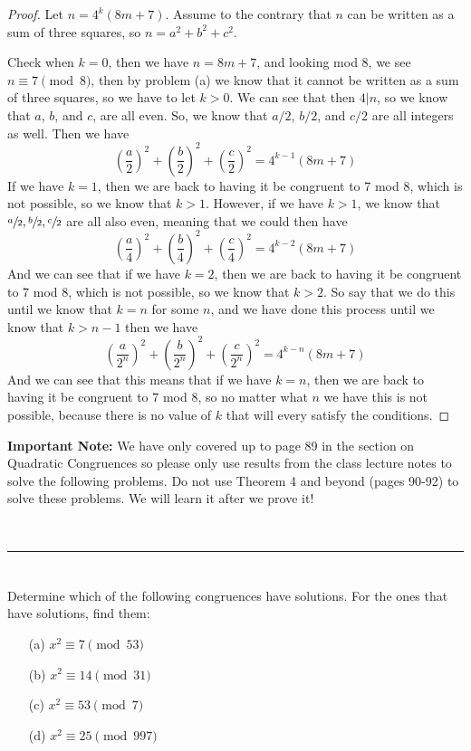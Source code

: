 \documentclass[11pt]{article}
\begin{document}
\begin{proof}
  Let $n=4^k(8m+7)$. Assume to the contrary that $n$ can be written as a sum of three squares, so $n=a^2+b^2+c^2$.

  Check when $k=0$, then we have $n=8m+7$, and looking mod 8, we see $n\equiv 7\pmod{8}$, then by problem (a) we know that it cannot be written as a sum of three squares, so we have to let $k>0$.
  We can see that then $4|n$, so we know that $a$, $b$, and $c$, are all even. So, we know that $a/2$, $b/2$, and $c/2$ are all integers as well. Then we have
  \[
    \left(\frac{a}{2}\right)^2 + \left(\frac{b}{2}\right)^2 + \left(\frac{c}{2}\right)^2 = 4^{k-1} (8m+7)
  \]
  If we have $k=1$, then we are back to having it be congruent to 7 mod 8, which is not possible, so we know that $k>1$. However, if we have $k>1$, we know that $\sfrac{a}{2},\sfrac{b}{2}, \sfrac{c}{2}$ are all also even, meaning that we could then have
  \[
    \left(\frac{a}{4}\right)^2 + \left(\frac{b}{4}\right)^2 + \left(\frac{c}{4}\right)^2 = 4^{k-2} (8m+7)
  \]
  And we can see that if we have $k=2$, then we are back to having it be congruent to 7 mod 8, which is not possible, so we know that $k>2$.
  So say that we do this until we know that $k=n$ for some $n$, and we have done this process until we know that $k>n-1$ then we have
  \[
    \left(\frac{a}{2^{n}}\right)^2 + \left(\frac{b}{2^{n}}\right)^2 + \left(\frac{c}{2^{n}}\right)^2 = 4^{k-n} (8m+7)
  \]
  And we can see that this means that if we have $k=n$, then we are back to having it be congruent to 7 mod 8, so no matter what $n$ we have this is not possible, because there is no value of $k$ that will every satisfy the conditions.


\end{proof}


\textbf{Important Note:} We have only covered up to page 89 in the  section on Quadratic Congruences so please only use results from the class lecture notes to solve the following problems. Do not use Theorem 4 and beyond (pages 90-92) to solve these problems. We will learn it after we prove it!

~\\
\hrule

\section{} Determine which of the following congruences have solutions. For the ones that have solutions, find them:
\begin{itemize}
  \item [(a)] $x^2\equiv 7 \pmod{53}$
  \item [(b)] $x^2\equiv 14 \pmod{31}$
  \item [(c)] $x^2\equiv 53 \pmod{7}$
  \item [(d)] $x^2\equiv 25 \pmod{997}$
\end{itemize}
\end{document}
